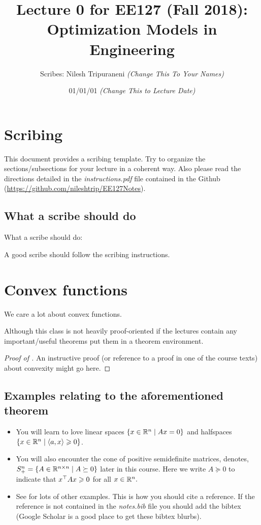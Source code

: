 \documentclass[12pt]{article}
\title{Lecture 0 for EE127 (Fall 2018): Optimization Models in Engineering}
\author{Scribes: Nilesh Tripuraneni \textit{(Change This To Your Names)}}
\date{01/01/01 \textit{(Change This to Lecture Date)}}
\begin{document}
\maketitle

\section{Scribing}

This document provides a scribing template. Try to organize the sections/subsections for your lecture in a coherent way. Also please read the directions detailed in the \emph{instructions.pdf} file contained in the Github (\url{https://github.com/nileshtrip/EE127Notes}).

\subsection{What a scribe should do}
What a scribe should do:
\begin{definition}
A good scribe should follow the scribing instructions.
\end{definition}

\section{Convex functions}
We care a lot about convex functions.

\begin{theorem}
Although this class is not heavily proof-oriented if the lectures contain any important/useful theorems put them in a theorem environment.
\end{theorem}
\begin{proof}[Proof of ]
An instructive proof (or reference to a proof in one of the course texts) about convexity might go here.
\end{proof}

\subsection{Examples relating to the aforementioned theorem}
\begin{itemize}
\item You will learn to love linear spaces $\{x\in\mathbb{R}^n\mid Ax=0\}$ and halfspaces $\{x\in\mathbb{R}^n \mid \langle a, x\rangle \geqslant 0 \}$.
\item You will also encounter the cone of positive semidefinite matrices, denotes, $S^n_+ = \{ A\in\mathbb{R}^{n\times n}\mid A\succeq 0\}$ later in this course. Here we write $A\succeq 0$ to indicate that $x^\top A x\geqslant 0$ for all $x\in\mathbb{R}^n.$
\item See \cite{boyd2004convex} for lots of other examples. This is how you should cite a reference. If the reference is not contained in the \emph{notes.bib} file you should add the bibtex (Google Scholar is a good place to get these bibtex blurbs).
\end{itemize}
\end{document}
